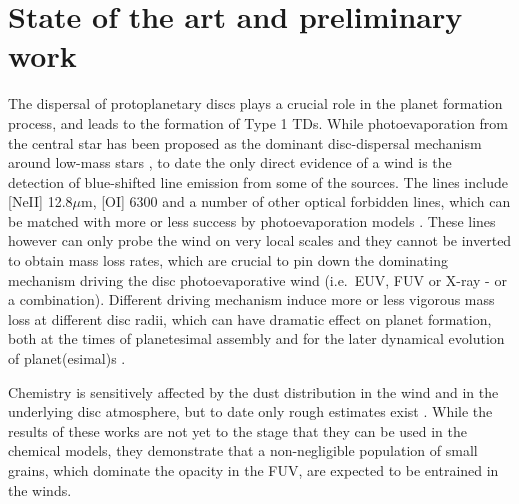 \documentclass[10pt,fleqn,twoside]{article}
\begin{document}
\section{State of the art and preliminary work}
\renewcommand{\leftmark}{\sc State of the Art and preliminary work}

The dispersal of protoplanetary discs plays a crucial role in the
planet formation process, and leads to the formation of Type
1 TDs. While photoevaporation from the central star has been proposed
as the dominant disc-dispersal mechanism around low-mass stars
\citep[e.g.,][]{2001MNRAS.328..485C}, to date the only direct evidence of a
wind is the detection of blue-shifted line emission from some of the
sources. The lines include [NeII] 12.8$\mu$m, [OI] 6300 and a number
of other optical forbidden lines, which can be matched with more or
less success by photoevaporation models \citep[e.g.,][]{1995ApJ...452..736H,
2008MNRAS.391L..64A, 2013ApJ...772...60R, 2014A&A...569A...5N, 
2009ApJ...702..724P, 2010MNRAS.401.1636S, 2010MNRAS.406.1553E,
2016MNRAS.460.3472E, 2016ApJ...831..169S}. These lines however
can only probe the wind on very local scales and they cannot be
inverted to obtain mass loss rates, which are crucial to pin down the
dominating mechanism driving the disc photoevaporative wind
(i.e.\ EUV, FUV or X-ray - or a combination). Different driving
mechanism induce more or less vigorous mass loss at different disc
radii, which  can have dramatic effect on planet formation, both at
the times of planetesimal assembly and for the later dynamical
evolution of planet(esimal)s 
\citep[e.g.,][or the discussion in projects B1 and B2]{2012MNRAS.422L..82A, 2015MNRAS.450.3008E}.

Chemistry is
sensitively affected by the dust distribution in the wind and in the
underlying disc atmosphere, but to date only rough estimates exist
\citep[e.g.,][]{2011MNRAS.411.1104O, 2016MNRAS.463.2725H, 
2016MNRAS.461..742H}. While
the results of these works are not yet to the stage that they can 
be used in the chemical models, they demonstrate
that a non-negligible population of small grains, which dominate the
opacity in the FUV, are expected to be entrained in the winds. 
\end{document}
